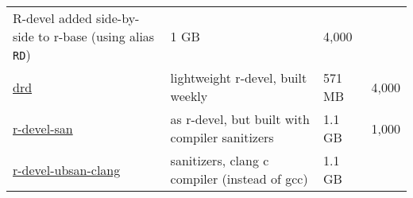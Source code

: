 \begin{longtable}[]{@{}llll@{}}
\begin{minipage}[t]{0.50\columnwidth}
R-devel added side-by-side to r-base (using alias \texttt{RD})\strut
\end{minipage} & \begin{minipage}[t]{0.08\columnwidth}\raggedright\strut
1 GB\strut
\end{minipage} & \begin{minipage}[t]{0.10\columnwidth}\raggedright\strut
4,000\strut
\end{minipage}\tabularnewline
\begin{minipage}[t]{0.20\columnwidth}\raggedright\strut
\href{https://hub.docker.com/r/rocker/drd}{drd}\strut
\end{minipage} & \begin{minipage}[t]{0.50\columnwidth}\raggedright\strut
lightweight r-devel, built weekly\strut
\end{minipage} & \begin{minipage}[t]{0.08\columnwidth}\raggedright\strut
571 MB\strut
\end{minipage} & \begin{minipage}[t]{0.10\columnwidth}\raggedright\strut
4,000\strut
\end{minipage}\tabularnewline
\begin{minipage}[t]{0.20\columnwidth}\raggedright\strut
\href{https://hub.docker.com/r/rocker/r-devel-san}{r-devel-san}\strut
\end{minipage} & \begin{minipage}[t]{0.50\columnwidth}\raggedright\strut
as r-devel, but built with compiler sanitizers\strut
\end{minipage} & \begin{minipage}[t]{0.08\columnwidth}\raggedright\strut
1.1 GB\strut
\end{minipage} & \begin{minipage}[t]{0.10\columnwidth}\raggedright\strut
1,000\strut
\end{minipage}\tabularnewline
\begin{minipage}[t]{0.20\columnwidth}\raggedright\strut
\href{https://hub.docker.com/r/rocker/r-devel-ubsan-clang}{r-devel-ubsan-clang}\strut
\end{minipage} & \begin{minipage}[t]{0.50\columnwidth}\raggedright\strut
sanitizers, clang c compiler (instead of gcc)\strut
\end{minipage} & \begin{minipage}[t]{0.08\columnwidth}\raggedright\strut
1.1 GB\strut
\end{minipage} & \begin{minipage}[t]{0.10\columnwidth}\raggedright\strut

\end{minipage}
\end{longtable}
